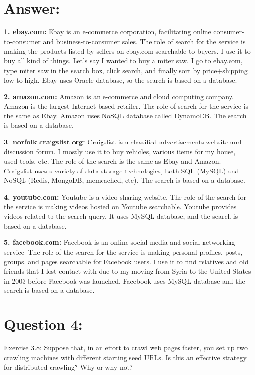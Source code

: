 \documentclass[a4paper, 11pt]{article}
\begin{document}
\section*{Answer:}

\textbf{1. ebay.com:}
Ebay is an e-commerce corporation, facilitating online consumer-to-consumer and business-to-consumer sales. The role of search for the service is making the products listed by sellers on ebay.com searchable to buyers. I use it to buy all kind of things. Let's say I wanted to buy a miter saw. I go to ebay.com, type miter saw in the search box, click search, and finally sort by price+shipping low-to-high. Ebay uses Oracle database, so the search is based on a database.

\textbf{2. amazon.com:}
Amazon is an e-commerce and cloud computing company. Amazon is the largest Internet-based retailer. The role of search for the service is the same as Ebay. Amazon uses NoSQL database called DynamoDB. The search is based on a database.

\textbf{3. norfolk.craigslist.org:}
Craigslist is a classified advertisements website and discussion forum. I mostly use it to buy vehicles, various items for my house, used tools, etc. The role of the search is the same as Ebay and Amazon. Craigslist uses a variety of data storage technologies, both SQL (MySQL) and NoSQL (Redis, MongoDB, memcached, etc). The search is based on a database.

\textbf{4. youtube.com:}
Youtube is a video sharing website. The role of the search for the service is making videos hosted on Youtube searchable. Youtube provides videos related to the search query. It uses MySQL database, and the search is based on a database.

\textbf{5. facebook.com:}
Facebook is an online social media and social networking service. The role of the search for the service is making personal profiles, posts, groups, and pages searchable for Facebook users. I use it to find relatives and old friends that I lost contact with due to my moving from Syria to the United States in 2003 before Facebook was launched. Facebook uses MySQL database and the search is based on a database.


\section*{Question 4:}
Exercise 3.8: Suppose that, in an effort to crawl web pages faster, you set up two crawling
machines with different starting seed URLs. Is this an effective strategy for
distributed crawling? Why or why not?
\end{document}
